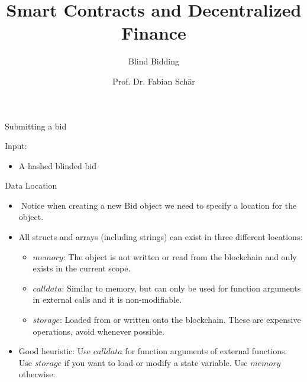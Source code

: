 \documentclass[]{beamer}
\title{Smart Contracts and Decentralized Finance}
\subtitle{Blind Bidding}
\author{Prof. Dr. Fabian Sch\"ar}
\institute{University of Basel}
\begin{document}
\thispagestyle{empty}
\begin{frame}[noframenumbering]
	\titlepage
\end{frame}

\begin{frame}{Submitting a bid}
{
	Input:
	\begin{itemize}
		\item A hashed blinded bid
	\end{itemize}
\vspace{.3cm}
}
\vspace{.3cm}

\end{frame}

\begin{frame}{Data Location}
	\begin{itemize}
		\item<1-> Notice when creating a new Bid object we need to specify a location for the object.
		\item<2-> All structs and arrays (including strings) can exist in three different locations:
		
		\begin{itemize}
			\item<3-> $memory$: The object is not written or read from the blockchain and only exists in the current scope.
			\item<4-> $calldata$: Similar to memory, but can only be used for function arguments in external calls and it is non-modifiable.
			\item<5-> $storage$: Loaded from or written onto the blockchain. These are expensive operations, avoid whenever possible.		
		\end{itemize}
		
		\item<6-> Good heuristic: Use $calldata$ for function arguments of external functions. Use $storage$ if you want to load or modify a state variable. Use $memory$ otherwise.
	\end{itemize}
\end{frame}
\end{document}

